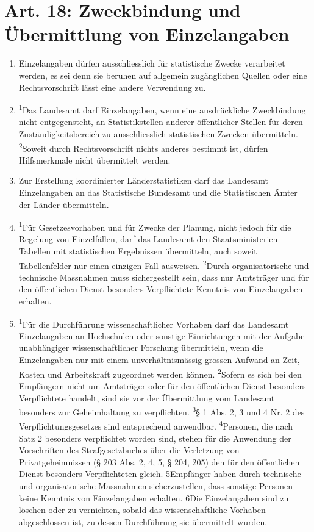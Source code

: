 \documentclass[A4, 12pt]{scrbook}
\begin{document}
    \section{Art. 18: Zweckbindung und Übermittlung von Einzelangaben}
        \begin{enumerate}[label=(\arabic*)]
            \item Einzelangaben dürfen ausschliesslich für statistische Zwecke verarbeitet werden, es sei denn sie beruhen auf allgemein zugänglichen Quellen oder eine Rechtsvorschrift lässt eine andere Verwendung zu.
            \item \textsuperscript{1}Das Landesamt darf Einzelangaben, wenn eine ausdrückliche Zweckbindung nicht entgegensteht, an Statistikstellen anderer öffentlicher Stellen für deren Zuständig\-keitsbereich zu ausschliesslich statistischen Zwecken übermitteln. \textsuperscript{2}Soweit durch Rechtsvorschrift nichts anderes bestimmt ist, dürfen Hilfsmerkmale nicht über\-mit\-telt werden.
            \item Zur Erstellung koordinierter Länderstatistiken darf das Landesamt Einzel\-an\-ga\-ben an das Statistische Bundesamt und die Statistischen Ämter der Länder über\-mitteln.
            \item \textsuperscript{1}Für Gesetzesvorhaben und für Zwecke der Planung, nicht jedoch für die Regelung von Einzelfällen, darf das Landesamt den Staatsministerien Tabellen mit statistischen Ergebnissen übermitteln, auch soweit Tabellenfelder nur einen einzigen Fall ausweisen. \textsuperscript{2}Durch organisatorische und technische Massnahmen muss sichergestellt sein, dass nur Amtsträger und für den öffentlichen Dienst besonders Verpflichtete Kenntnis von Einzelangaben erhalten.
            \item \textsuperscript{1}Für die Durchführung wissenschaftlicher Vorhaben darf das Landesamt Einzelangaben an Hochschulen oder sonstige Einrichtungen mit der Aufgabe unabhängiger wissenschaftlicher Forschung übermitteln, wenn die Einzelangaben nur mit einem unverhältnismässig grossen Aufwand an Zeit, Kosten und Arbeitskraft zugeordnet werden können. \textsuperscript{2}Sofern es sich bei den Empfängern nicht um Amtsträger oder für den öffentlichen Dienst besonders Verpflichtete handelt, sind sie vor der Übermittlung vom Landesamt besonders zur Geheimhaltung zu verpflichten. \textsuperscript{3}§ 1 Abs. 2, 3 und 4 Nr. 2 des Verpflichtungsgesetzes sind entsprechend anwendbar. \textsuperscript{4}Personen, die nach Satz 2 besonders verpflichtet worden sind, stehen für die Anwendung der Vorschriften des Strafgesetzbuches über die Verletzung von Privatgeheimnissen (§ 203 Abs. 2, 4, 5, § 204, 205) den für den öffentlichen Dienst besonders Verpflichteten gleich. 5Empfänger haben durch technische und organisatorische Massnahmen sicherzustellen, dass sonstige Personen keine Kenntnis von Einzelangaben erhalten. 6Die Einzelangaben sind zu löschen oder zu vernichten, sobald das wissenschaftliche Vorhaben abgeschlossen ist, zu dessen Durchführung sie übermittelt wurden.

\end{enumerate}
\end{document}
